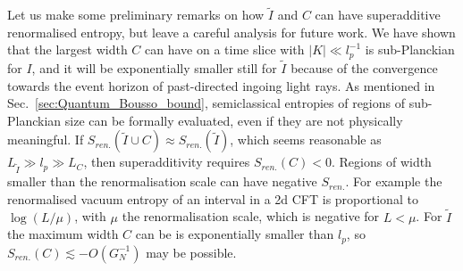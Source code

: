 \documentclass[a4paper,11pt]{article}
\newcommand{\cts}[1]{\ignorespaces}
\def\bne{\begin{equation}}
\def\ene{\end{equation}}
\newcommand{\del}{\partial}
\begin{document}
Let us make some preliminary remarks on how $\tilde I$ and $C$ can have superadditive renormalised entropy, but leave a careful analysis for future work. We have shown that the largest width $C$ can have on a time slice with $|K| \ll l_p^{-1}$ is sub-Planckian for $I$, and it will be exponentially smaller still for $\tilde I$ because of the convergence towards the event horizon of past-directed ingoing light rays. As mentioned in Sec.~\ref{sec:Quantum_Bousso_bound}, semiclassical entropies of regions of sub-Planckian size can be formally evaluated, even if they are not physically meaningful. If $S_{ren.} (\tilde I \cup C) \approx S_{ren.} (\tilde I)$, which seems reasonable as $L_{\tilde I} \gg l_p \gg L_{C}$, then superadditivity requires $S_{ren.}(C) < 0 $. Regions of width smaller than the renormalisation scale can have negative $S_{ren.}$. For example the renormalised vacuum entropy of an interval in a 2d CFT is proportional to $\log (L/\mu)$, with $\mu$ the renormalisation scale, which is negative for $L < \mu$.   For $\tilde I$ the maximum width $C$ can be is exponentially smaller than $l_p$, so $S_{ren.}(C) \lesssim -O(G_N^{-1})$ may be possible. 




\end{document}
